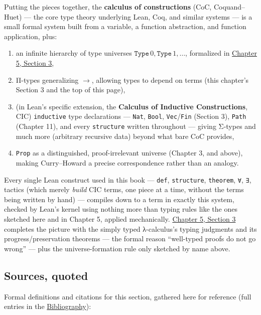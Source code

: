 Putting the pieces together, the \textbf{calculus of constructions} (CoC, Coquand--Huet) --- the core type theory underlying Lean, Coq, and similar systems --- is a small formal system built from a variable, a function abstraction, and function application, plus:

\begin{enumerate}
\def\labelenumi{\arabic{enumi}.}
\tightlist
\item
  an infinite hierarchy of type universes \(\mathtt{Type}\,0,
  \mathtt{Type}\,1, \ldots\), formalized in \hyperref[sec:05-rigor-check:03-typing-rules-and-safety:1]{Chapter 5, Section 3},
\item
  Π-types generalizing \(\to\), allowing types to depend on terms (this chapter's Section 3 and the top of this page),
\item
  (in Lean's specific extension, the \textbf{Calculus of Inductive Constructions}, CIC) \texttt{inductive} type declarations --- \texttt{Nat}, \texttt{Bool}, \texttt{Vec}/\texttt{Fin} (Section 3), \texttt{Path} (Chapter 11), and every \texttt{structure} written throughout --- giving Σ-types and much more (arbitrary recursive data) beyond what bare CoC provides,
\item
  \texttt{Prop} as a distinguished, proof-irrelevant universe (Chapter 3, and above), making Curry--Howard a precise correspondence rather than an analogy.
\end{enumerate}

Every single Lean construct used in this book --- \texttt{def}, \texttt{structure}, \texttt{theorem}, \texttt{∀}, \texttt{∃}, tactics (which merely \emph{build} CIC terms, one piece at a time, without the terms being written by hand) --- compiles down to a term in exactly this system, checked by Lean's kernel using nothing more than typing rules like the ones sketched here and in Chapter 5, applied mechanically. \hyperref[sec:05-rigor-check:03-typing-rules-and-safety:1]{Chapter 5, Section 3} completes the picture with the simply typed λ-calculus's typing judgments and its progress/preservation theorems --- the formal reason ``well-typed proofs do not go wrong'' --- plus the universe-formation rule only sketched by name above.

\subsection{Sources, quoted}\label{sec:01-basics:05-pi-sigma-and-coc:8}

Formal definitions and citations for this section, gathered here for reference (full entries in the \hyperref[sec:root:bibliography:1]{Bibliography}):

